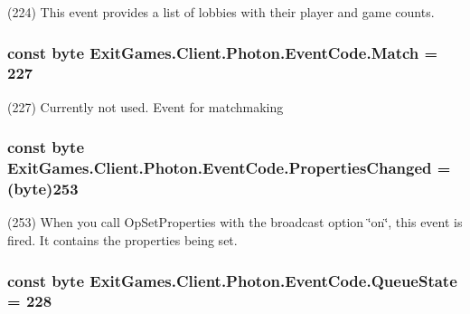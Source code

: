 (224) This event provides a list of lobbies with their player and game counts.

\subsubsection[{\texorpdfstring{Match}{Match}}]{\setlength{\rightskip}{0pt plus 5cm}const byte Exit\+Games.\+Client.\+Photon.\+Event\+Code.\+Match = 227}\hypertarget{class_exit_games_1_1_client_1_1_photon_1_1_event_code_a4ae30567f95504ae53132588271fe8c5}{}\label{class_exit_games_1_1_client_1_1_photon_1_1_event_code_a4ae30567f95504ae53132588271fe8c5}


(227) Currently not used. Event for matchmaking

\subsubsection[{\texorpdfstring{Properties\+Changed}{PropertiesChanged}}]{\setlength{\rightskip}{0pt plus 5cm}const byte Exit\+Games.\+Client.\+Photon.\+Event\+Code.\+Properties\+Changed = (byte)253}\hypertarget{class_exit_games_1_1_client_1_1_photon_1_1_event_code_a8a72126057d0a742d14a2013a1f3415a}{}\label{class_exit_games_1_1_client_1_1_photon_1_1_event_code_a8a72126057d0a742d14a2013a1f3415a}


(253) When you call Op\+Set\+Properties with the broadcast option \char`\"{}on\char`\"{}, this event is fired. It contains the properties being set.

\subsubsection[{\texorpdfstring{Queue\+State}{QueueState}}]{\setlength{\rightskip}{0pt plus 5cm}const byte Exit\+Games.\+Client.\+Photon.\+Event\+Code.\+Queue\+State = 228}\hypertarget{class_exit_games_1_1_client_1_1_photon_1_1_event_code_a6fc53cb6aad4fcf42ee4b1340443d10b}{}\label{class_exit_games_1_1_client_1_1_photon_1_1_event_code_a6fc53cb6aad4fcf42ee4b1340443d10b}


